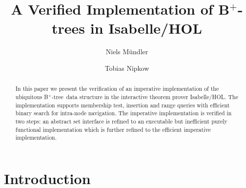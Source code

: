 \documentclass[runningheads]{llncs}
\newcommand{\btree}{B$^+$-tree}
\begin{document}
%
\title{A Verified Implementation of B$^+$-trees in Isabelle/HOL}
%
%
\author{Niels Mündler \and
Tobias Nipkow}
%
%
%
%
%
%


\maketitle

\begin{abstract}
    In this paper we present the verification of an imperative
    implementation of the ubiquitous \btree\ data structure in the
    interactive theorem prover Isabelle/HOL. The implementation supports
    membership test, insertion and range queries with efficient binary
    search for intra-node navigation. The imperative implementation is
    verified in two steps: an abstract set interface is refined to an
    executable but inefficient purely functional implementation which is further
    refined to the efficient imperative implementation.
\end{abstract}

\section{Introduction}
\label{sec:introduction}
\end{document}
